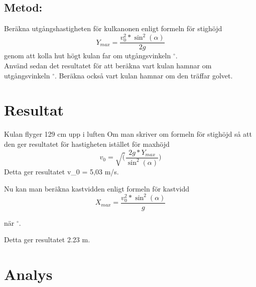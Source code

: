 \documentclass[11p]{article}
\begin{document}
    \subsection{Metod:}
    Beräkna utgångshastigheten för kulkanonen enligt formeln för stighöjd
    \begin{equation}
        Y_{max} = \frac{v_0^2*\sin^2(\alpha)}{2g}
    \end{equation}
    genom att kolla hut högt kulan far om utgångsvinkeln \alpha {} $^{\circ}$. \\
    Använd sedan det resultatet för att beräkna vart kulan hamnar om utgångsvinkeln \alpha {} $^{\circ}$.
    Beräkna också vart kulan hamnar om den träffar golvet.
    \paragraph{}

    \section{Resultat}
    Kulan flyger 129 cm upp i luften
    Om man skriver om formeln för stighöjd så att den ger resultatet för hastigheten istället för maxhöjd
    \begin{equation}
       v_0 = \sqrt(\frac{2g*Y_{max}}{\sin^2(\alpha)})
    \end{equation}
    Detta ger resultatet {v_0} = 5,03 m/s.

    Nu kan man beräkna kastvidden enligt formeln för kastvidd
    \begin{equation}
        X_{max} = \frac{v_0^2*\sin^2(\alpha)}{g}
    \end{equation}

    när \alpha {} $^{\circ}$.

    Detta ger resultatet 2.23 m.


    \section{Analys}
\end{document}
